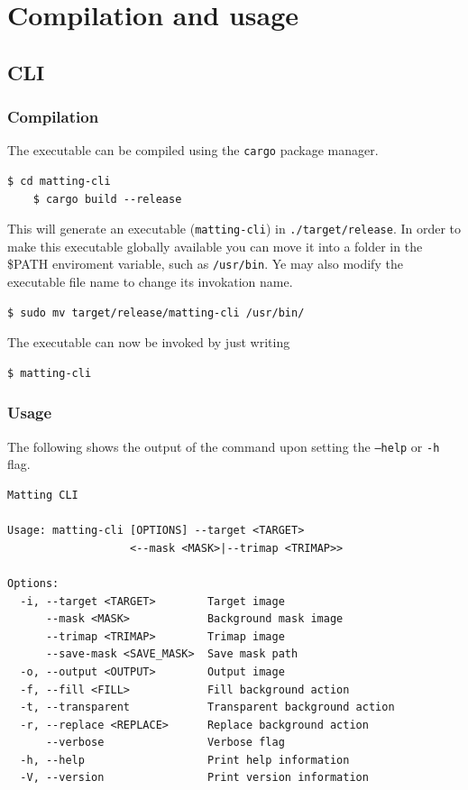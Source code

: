 \documentclass[a4paper]{article}
\begin{document}
\wrapfill

\pagebreak


\section{Compilation and usage}

\subsection{CLI}

\subsubsection{Compilation}

The executable can be compiled using the \texttt{cargo}
package manager.

\begin{lstlisting}[style=boxed]
    $ cd matting-cli
    $ cargo build --release
\end{lstlisting}

This will generate an executable (\texttt{matting-cli})
in \texttt{./target/release}.
In order to make this executable globally available
you can move it into a folder in the \textsc{\$PATH} enviroment
variable, such as \texttt{/usr/bin}.
Ye may also modify the executable file name to change its invokation
name.

\begin{lstlisting}[style=boxed]
    $ sudo mv target/release/matting-cli /usr/bin/
\end{lstlisting}

The executable can now be invoked by just writing
\begin{lstlisting}[style=boxed]
    $ matting-cli
\end{lstlisting}

\subsubsection{Usage}

The following shows the output of the command upon
setting the \texttt{--help} or \texttt{-h} flag.
\begin{lstlisting}[style=boxed]
Matting CLI

Usage: matting-cli [OPTIONS] --target <TARGET>
                   <--mask <MASK>|--trimap <TRIMAP>>

Options:
  -i, --target <TARGET>        Target image
      --mask <MASK>            Background mask image
      --trimap <TRIMAP>        Trimap image
      --save-mask <SAVE_MASK>  Save mask path
  -o, --output <OUTPUT>        Output image
  -f, --fill <FILL>            Fill background action
  -t, --transparent            Transparent background action
  -r, --replace <REPLACE>      Replace background action
      --verbose                Verbose flag
  -h, --help                   Print help information
  -V, --version                Print version information
\end{lstlisting}
\end{document}
